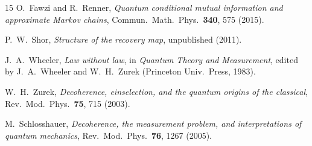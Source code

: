 \documentclass[prl,twocolumn,superscriptaddress,longbibliography,floatfix]{revtex4-2}
\begin{document}
\begin{thebibliography}{15}
O.~Fawzi and R.~Renner,
\textit{Quantum conditional mutual information and approximate Markov chains},
Commun.\ Math.\ Phys.\ \textbf{340}, 575 (2015).

P.~W.~Shor,
\textit{Structure of the recovery map},
unpublished (2011).

J.~A.~Wheeler,
\textit{Law without law},
in \textit{Quantum Theory and Measurement},
edited by J.~A.~Wheeler and W.~H.~Zurek (Princeton Univ.\ Press, 1983).

W.~H.~Zurek,
\textit{Decoherence, einselection, and the quantum origins of the classical},
Rev.\ Mod.\ Phys.\ \textbf{75}, 715 (2003).

M.~Schlosshauer,
\textit{Decoherence, the measurement problem, and interpretations of
quantum mechanics},
Rev.\ Mod.\ Phys.\ \textbf{76}, 1267 (2005).

\end{thebibliography}
\end{document}
